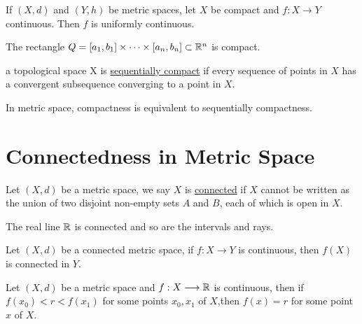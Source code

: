 \begin{theorem}\label{continuous function on compact set is uniformly continuous}
    If $(X,d)$ and $(Y,h)$ be metric spaces, let $X$ be compact and $f:X \longrightarrow Y$ continuous. 
    Then $f$ is uniformly continuous.
\end{theorem}



\begin{theorem}\label{rectanglecompact}
    The rectangle $Q=[a_1,b_1]\times \cdots \times [a_n,b_n] \subset \mathbb{R}^n$ is compact.
\end{theorem}


\begin{definition}
    a topological space X is \underline{sequentially compact} if every sequence of points in $X$ has a convergent subsequence converging to a point in $X$.
\end{definition}

\begin{theorem}
    In metric space, compactness is equivalent to sequentially compactness.
\end{theorem}

\section{Connectedness in  Metric Space}

\begin{definition}
    Let $(X,d)$ be a metric space, we say $X$ is \underline{connected} if $X$ cannot be written as the union of two disjoint non-empty sets $A$ and $B$, each of which is open in $X$.
\end{definition}

\begin{theorem}
    The real line $\mathbb{R}$ is connected and so are the intervals and rays.
\end{theorem}

\begin{theorem}
    Let $(X,d)$ be a connected metric space, if $f:X \longrightarrow Y$ is continuous, then $f(X)$ is connected in $Y$.
\end{theorem}

\begin{corollary}
    Let $(X,d)$ be a metric space and $f:X \longrightarrow \mathbb{R}$ is continuous, then if $f(x_0) < r < f(x_1)$ for some points $x_0,x_1$ of $X$,then $f(x)=r$ for some point $x$ of $X$.
\end{corollary}

